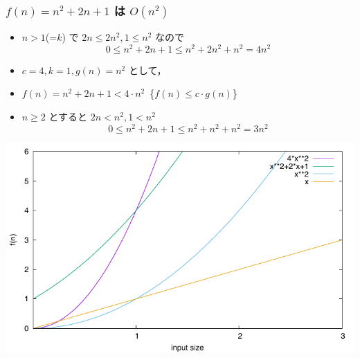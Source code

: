 \begin{frame}[shrink]
\frametitle{\(f(n)=n^2+2n+1\) は \(O(n^2)\)}
  \begin{itemize}
\item \(n>1\)(=\(k\)) で \(2n\leq 2n^2, 1\leq n^2\) なので
    \begin{displaymath}
0\leq n^2+2n+1\leq n^2+2n^2+n^2= 4n^2
    \end{displaymath}
\item \(c=4, k=1, g(n)=n^2\) として，
\item \(f(n)=n^2+2n+1<4\cdot n^2\)\ \textemdash\{\(f(n)\leq c\cdot g(n)\)\}
\item \(n\geq 2\) とすると \(2n<n^2, 1<n^2\) 
    \begin{displaymath}
0\leq n^2+2n+1\leq n^2+n^2+n^2= 3n^2
    \end{displaymath}
  \end{itemize}
  \begin{center}
\includegraphics[scale=0.6]{./progs/witness.pdf}
  \end{center}
\end{frame}
